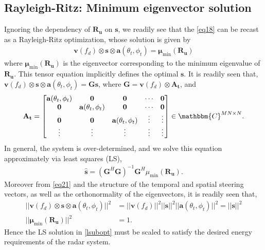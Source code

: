 \documentclass[11pt,draftclsnofoot,onecolumn]{IEEEtran}
\theoremstyle{definition}
\theoremstyle{remark}
\begin{document}
\subsection{Rayleigh-Ritz: Minimum eigenvector solution}
Ignoring the dependency of $\mathbf{R_u}$ on $\mathbf{s}$, we readily see that the \eqref{eq18} can be recast as a Rayleigh-Ritz optimization, whose solution is given by
\begin{align} \label{eq21}
\mathbf{v}(f_d)\otimes\mathbf{s}\otimes\mathbf{a}(\theta_t,\phi_t)=\boldsymbol{\mu}_{\min}(\mathbf{R_u})
\end{align}
where $\boldsymbol{\mu}_{\min}(\mathbf{R_u})$ is the eigenvector corresponding to the minimum eigenvalue of $\mathbf{R_u}$. This tensor equation implicitly defines the optimal $\mathbf{s}$. It is readily seen that, $\mathbf{v}(f_d)\otimes\mathbf{s}\otimes\mathbf{a}(\theta_t,\phi_t)=\mathbf{G}\mathbf{s}$, where $\mathbf{G}=\mathbf{v}(f_d)\otimes\mathbf{A_t}$, and 
\begin{align*}
\mathbf{A_t}=\begin{bmatrix}
    \mathbf{a}(\theta_t,\phi_t) &\mathbf{0} &\mathbf{0} &\cdots &\mathbf{0} \\
    \mathbf{0}& \mathbf{a}(\theta_t,\phi_t) & \mathbf{0} &\cdots &\mathbf{0} \\
    \mathbf{0}& \mathbf{0} &\mathbf{a}(\theta_t,\phi_t) &\vdots  &\vdots \\
    \vdots & \vdots &\vdots &\vdots &\vdots
    \end{bmatrix} \in\mathbbm{C}^{MN\times N}.
\end{align*}
In general, the system is over-determined, and we solve this equation approximately via least squares (LS), 
\begin{align} \label{lsubopt}
\mathbf{\hat{s}}=(\mathbf{G}^H\mathbf{G})^{-1}\mathbf{G}^H\mu_{\min}(\mathbf{R_u}).
\end{align}
Moreover from \eqref{eq21} and the structure of the temporal and spatial steering vectors,  as well as the orthonormality of the eigenvectors, it is readily seen that,
\begin{align} \label{eqrayleigh}
||\mathbf{v}(f_d)\otimes\mathbf{s}\otimes\mathbf{a}(\theta_t,\phi_t)||^2&=
|| \mathbf{v}(f_d)||^2 || \mathbf{s}||^2 ||\mathbf{a}(\theta_t,\phi_t) ||^2=|| \mathbf{s}||^2 \nonumber \\
||\boldsymbol{\mu}_{\min}(\mathbf{R_u})||^2&=1.
\end{align}
Hence  the LS solution in \eqref{lsubopt} must be scaled to satisfy the desired energy requirements of the radar system.
 
\end{document}
